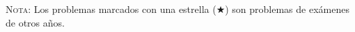 \documentclass[a4paper,titlepage]{article}
\begin{document}
%
%

\vspace{2cm}

\textsc{Nota}: Los problemas marcados con una estrella ($\bigstar$) son problemas de
exámenes de otros años.
\end{document}
